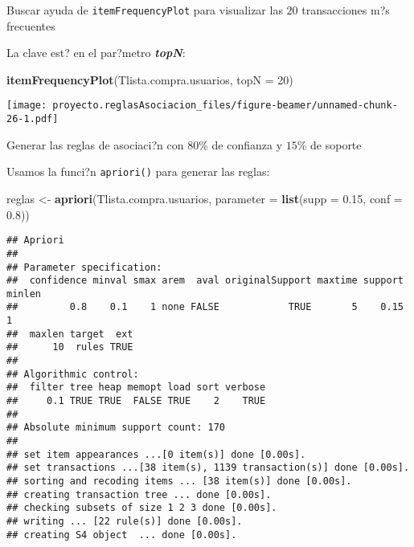 \documentclass[
  ignorenonframetext,
]{beamer}
\newenvironment{Shaded}{\begin{snugshade}}{\end{snugshade}}
\newcommand{\DataTypeTok}[1]{\textcolor[rgb]{0.13,0.29,0.53}{#1}}
\newcommand{\DecValTok}[1]{\textcolor[rgb]{0.00,0.00,0.81}{#1}}
\newcommand{\FloatTok}[1]{\textcolor[rgb]{0.00,0.00,0.81}{#1}}
\newcommand{\KeywordTok}[1]{\textcolor[rgb]{0.13,0.29,0.53}{\textbf{#1}}}
\newcommand{\NormalTok}[1]{#1}
\newcommand{\StringTok}[1]{\textcolor[rgb]{0.31,0.60,0.02}{#1}}
\begin{document}
\begin{frame}[fragile]{Buscar ayuda de \texttt{itemFrequencyPlot} para
visualizar las \(20\) transacciones m?s frecuentes}
\protect\hypertarget{buscar-ayuda-de-itemfrequencyplot-para-visualizar-las-20-transacciones-ms-frecuentes}{}

La clave est? en el par?metro \textbf{\emph{topN}}:

\begin{Shaded}
\begin{Highlighting}[]
\KeywordTok{itemFrequencyPlot}\NormalTok{(Tlista.compra.usuarios, }\DataTypeTok{topN =} \DecValTok{20}\NormalTok{)}
\end{Highlighting}
\end{Shaded}

\texttt{[image: proyecto.reglasAsociacion\_files/figure-beamer/unnamed-chunk-26-1.pdf]}

\end{frame}

\begin{frame}[fragile]{Generar las reglas de asociaci?n con \(80\)\% de
confianza y \(15\)\% de soporte}
\protect\hypertarget{generar-las-reglas-de-asociacin-con-80-de-confianza-y-15-de-soporte}{}

Usamos la funci?n \texttt{apriori()} para generar las reglas:

\begin{Shaded}
\begin{Highlighting}[]
\NormalTok{reglas <-}\StringTok{ }\KeywordTok{apriori}\NormalTok{(Tlista.compra.usuarios, }
                  \DataTypeTok{parameter =} \KeywordTok{list}\NormalTok{(}\DataTypeTok{supp =} \FloatTok{0.15}\NormalTok{, }\DataTypeTok{conf =} \FloatTok{0.8}\NormalTok{))}
\end{Highlighting}
\end{Shaded}

\begin{verbatim}
## Apriori
## 
## Parameter specification:
##  confidence minval smax arem  aval originalSupport maxtime support minlen
##         0.8    0.1    1 none FALSE            TRUE       5    0.15      1
##  maxlen target  ext
##      10  rules TRUE
## 
## Algorithmic control:
##  filter tree heap memopt load sort verbose
##     0.1 TRUE TRUE  FALSE TRUE    2    TRUE
## 
## Absolute minimum support count: 170 
## 
## set item appearances ...[0 item(s)] done [0.00s].
## set transactions ...[38 item(s), 1139 transaction(s)] done [0.00s].
## sorting and recoding items ... [38 item(s)] done [0.00s].
## creating transaction tree ... done [0.00s].
## checking subsets of size 1 2 3 done [0.00s].
## writing ... [22 rule(s)] done [0.00s].
## creating S4 object  ... done [0.00s].
\end{verbatim}

\end{frame}
\end{document}
